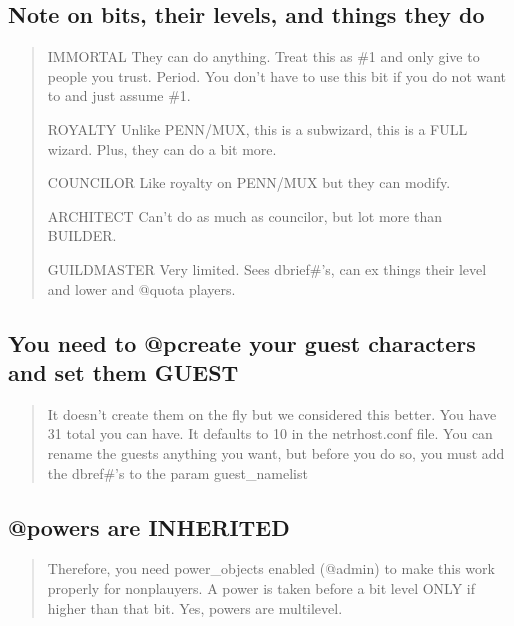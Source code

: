 \documentclass[letterpaper,10pt,english]{sphinxmanual}
\begin{document}
\subsection{Note on bits, their levels, and things they do}
\label{\detokenize{features:note-on-bits-their-levels-and-things-they-do}}\begin{quote}

\sphinxAtStartPar
IMMORTAL \sphinxhyphen{} They can do anything.  Treat this as \#1 and only give to
people you trust.  Period.   You don’t have to use this bit
if you do not want to and just assume \#1.

\sphinxAtStartPar
ROYALTY \sphinxhyphen{} Unlike PENN/MUX, this is  a sub\sphinxhyphen{}wizard, this is a
FULL wizard.  Plus, they can do a bit more.

\sphinxAtStartPar
COUNCILOR \sphinxhyphen{} Like royalty on PENN/MUX but they can modify.

\sphinxAtStartPar
ARCHITECT \sphinxhyphen{} Can’t do as much as councilor, but lot more than BUILDER.

\sphinxAtStartPar
GUILDMASTER \sphinxhyphen{} Very limited.  Sees dbrief\#’s, can ex things their
level and lower and @quota players.
\end{quote}


\subsection{You need to @pcreate your guest characters and set them GUEST}
\label{\detokenize{features:you-need-to-pcreate-your-guest-characters-and-set-them-guest}}\begin{quote}

\sphinxAtStartPar
It doesn’t create them on the fly but we considered this better.
You have 31 total you can have.  It defaults to 10 in the
netrhost.conf file.  You can rename the guests anything you want,
but before you do so, you must add the dbref\#’s to the param
guest\_namelist
\end{quote}


\subsection{@powers are INHERITED}
\label{\detokenize{features:powers-are-inherited}}\begin{quote}

\sphinxAtStartPar
Therefore, you need power\_objects enabled (@admin)
to make this work properly for non\sphinxhyphen{}plauyers.
A power is taken before a bit level ONLY if higher than that bit.
Yes, powers are multi\sphinxhyphen{}level.
\end{quote}
\end{document}
